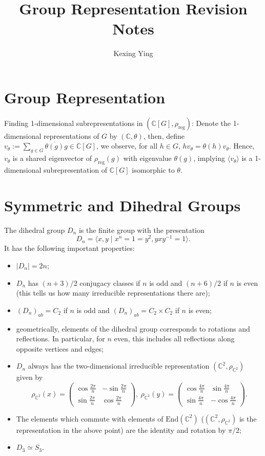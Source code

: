 \documentclass[]{article}
\title{Group Representation Revision Notes}
\author{Kexing Ying}
\theoremstyle{definition}
\begin{document}
\maketitle

\section*{Group Representation}

Finding 1-dimensional subrepresentations in \((\mathbb{C}[G], \rho_{\text{reg}})\): 
Denote the 1-dimensional representations of \(G\) by \((\mathbb{C}, \theta)\), 
then, define \(v_\theta := \sum_{g \in G} \overline{\theta(g)} g \in \mathbb{C}[G]\), 
we observe, for all \(h \in G\), \(hv_\theta = \theta(h)v_\theta\). Hence, 
\(v_\theta\) is a shared eigenvector of \(\rho_{\text{reg}}(g)\) with eigenvalue \(\theta(g)\), 
implying \(\langle v_\theta \rangle\) is a 1-dimensional subrepresentation of 
\(\mathbb{C}[G]\) isomorphic to \(\theta\).

\section*{Symmetric and Dihedral Groups}

The dihedral group \(D_n\) is the finite group with the presentation 
\[D_n = \langle x, y \mid x^n = 1 = y^2, y x y^{-1} = 1 \rangle.\]
It has the following important properties:
\begin{itemize}
  \item \(|D_n| = 2n\);
  \item \(D_n\) has \((n  + 3)/2\) conjugacy classes if \(n\) is odd and \((n + 6)/2\) if \(n\) is even 
    (this tells us how many irreducible representations there are);
  \item \((D_n)_{ab} = C_2\) if \(n\) is odd and \((D_n)_{ab} = C_2 \times C_2\) if \(n\) is even;
  \item geometrically, elements of the dihedral group corresponds to rotations and reflections. 
    In particular, for \(n\) even, this includes all reflections along opposite vertices and edges;
  \item \(D_n\) always has the two-dimensional irreducible representation \((\mathbb{C}^2, \rho_{\mathbb{C}^2})\) 
    given by 
    \[\rho_{\mathbb{C}^2}(x) = \begin{pmatrix}
      \cos \frac{2\pi}{n} & -\sin \frac{2\pi}{n} \\
      \sin \frac{2\pi}{n} & \cos \frac{2\pi}{n}
    \end{pmatrix},  \
    \rho_{\mathbb{C}^2}(y) = \begin{pmatrix}
      \cos \frac{4\pi}{n} & \sin \frac{4\pi}{n} \\
      \sin \frac{4\pi}{n} & -\cos \frac{4\pi}{n}
    \end{pmatrix}.\]
  \item The elements which commute with elements of \(\text{End}(\mathbb{C}^2)\) (\((\mathbb{C}^2, \rho_{\mathbb{C}^2})\) 
    is the representation in the above point) are the identity and rotation by \(\pi / 2\);
  \item \(D_3 \simeq S_3\).
\end{itemize}
\end{document}
